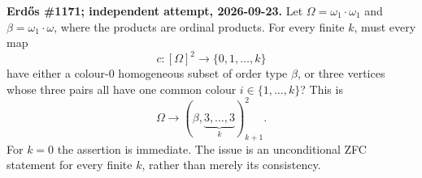 \textbf{Erd\H{o}s \#1171; independent attempt, 2026-09-23.}
Let $\Omega=\omega_1\cdot\omega_1$ and $\beta=\omega_1\cdot\omega$, where the products are ordinal products. For every finite $k$, must every map
\[
c:[\Omega]^2\longrightarrow\{0,1,\ldots,k\}
\]
have either a colour-$0$ homogeneous subset of order type $\beta$, or three vertices whose three pairs all have one common colour $i\in\{1,\ldots,k\}$? This is
\[
\Omega\longrightarrow(\beta,\underbrace{3,\ldots,3}_{k})^2_{k+1}.
\]
For $k=0$ the assertion is immediate. The issue is an unconditional ZFC statement for every finite $k$, rather than merely its consistency.
